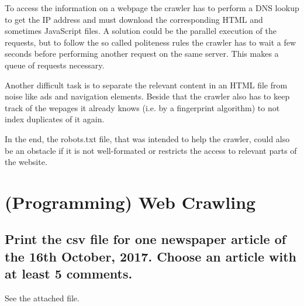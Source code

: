 \documentclass{scrartcl}
\begin{document}
To access the information on a webpage the crawler has to perform a DNS lookup to get the IP address and must download the corresponding HTML and sometimes JavaScript files. A solution could be the parallel execution of the requests, but to follow the so called politeness rules the crawler has to wait a few seconds before performing another request on the same server. This makes a queue of requests necessary.

Another difficult task is to separate the relevant content in an HTML file from noise like ads and navigation elements. Beside that the crawler also has to keep track of the wepages it already knows (i.e. by a fingerprint algorithm) to not index duplicates of it again.

In the end, the robots.txt file, that was intended to help the crawler, could also be an obstacle if it is not well-formated or restricts the access to relevant parts of the website.

\section{(Programming) Web Crawling}

\subsection{Print the csv file for one newspaper article of the 16th October, 2017. Choose an article with
	at least 5 comments. }

See the attached file.
\end{document}
